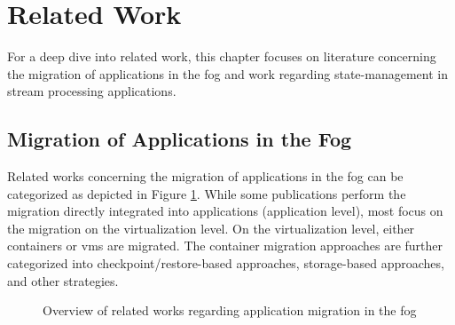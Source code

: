 \section{Related Work}
\label{lRelatedWork}
For a deep dive into related work, this chapter focuses on literature concerning the migration of applications in the fog and work regarding state-management in stream processing applications.

\subsection{Migration of Applications in the Fog}
\label{lMigrationInTheFog}
Related works concerning the migration of applications in the fog can be categorized as depicted in Figure \ref{fOverviewLiteratureFog}. While some publications perform the migration directly integrated into applications (application level), most focus on the migration on the virtualization level. On the virtualization level, either containers or \gls{vm}s are migrated. The container migration approaches are further categorized into checkpoint/restore-based approaches, storage-based approaches, and other strategies.

\begin{figure}[H]
\graphicspath{{./figures/code/}}

\caption{Overview of related works regarding application migration in the fog}
\label{fOverviewLiteratureFog}
\end{figure}


